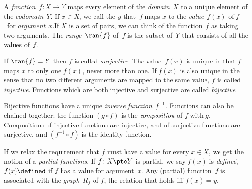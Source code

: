 A \emph{function}~$f\colon X \to Y$ maps every element of the
\emph{domain}~$X$ to a unique element of the \emph{codomain}~$Y$.  If
$x \in X$, we call the $y$ that~$f$ maps $x$ to the
\emph{value}~$f(x)$ of $f$~for \emph{argument}~$x$.If $X$ is a set of
pairs, we can think of the function~$f$ as taking two arguments. The
\emph{range}~$\ran{f}$ of~$f$ is the subset of~$Y$ that consists of
all the values of~$f$.

If $\ran{f} = Y$ then $f$ is called
\emph{surjective}.  The value~$f(x)$ is unique in that $f$ maps $x$ to
only one $f(x)$, never more than one. If $f(x)$ is also unique in the
sense that no two different arguments are mapped to the same value,
$f$ is called \emph{injective}.  Functions which are both injective
and surjective are called \emph{bijective}.

Bijective functions have a unique \emph{inverse function}~$f^{-1}$.
Functions can also be chained together: the function $(g \circ f)$ is
the \emph{composition} of $f$ with $g$. Compositions of injective
functions are injective, and of surjective functions are surjective,
and $(f^{-1} \circ f)$ is the identity function.

If we relax the requirement that $f$ must have a value for every $x
\in X$, we get the notion of a \emph{partial functions}.  If $f\colon
X \pto Y$ is partial, we say $f(x)$ is \emph{defined}, $f(x) \defined$
if $f$ has a value for argument~$x$.  Any (partial) function~$f$ is
associated with the \emph{graph}~$R_f$ of $f$, the relation that holds
iff $f(x) = y$.
